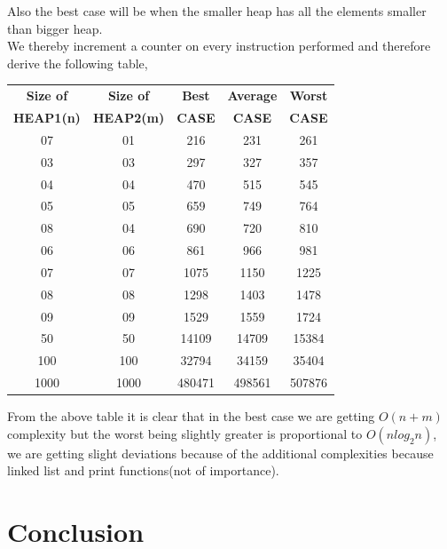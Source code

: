 \documentclass[conference]{IEEEtran}
\begin{document}
Also the best case will be when the smaller heap has all the elements smaller than bigger heap.\\
We thereby increment a counter on every instruction performed and therefore derive the following table,
\begin{table}[h!]
\begin{center}
    \label{tab:table1}
    \begin{tabular}{|c|c|c|c|c|} %
    \hline
     \textbf{Size of} & \textbf{Size of} & \textbf{Best} & \textbf{Average} & \textbf{Worst}\\
     \textbf{HEAP1(n)} & \textbf{HEAP2(m)} & \textbf{CASE} & \textbf{CASE} & \textbf{CASE}\\
      \hline
      07 & 01 & 216 & 231 & 261\\
      \hline
      03 & 03 & 297 & 327 & 357\\
      \hline
      04 & 04 & 470 & 515 & 545\\
      \hline
      05 & 05 & 659 & 749 & 764\\
      \hline
	  08 & 04 & 690 & 720 & 810\\
      \hline
	  06 & 06 & 861 & 966 & 981\\
      \hline
	  07 & 07 & 1075 & 1150 & 1225\\
      \hline
      08 & 08 & 1298 & 1403 & 1478\\
      \hline
      09 & 09 & 1529 & 1559 & 1724\\
      \hline
      50 & 50 & 14109 & 14709 & 15384\\
      \hline
      100 & 100 & 32794 & 34159 & 35404\\
      \hline
      1000 & 1000 & 480471 & 498561 & 507876\\
      \hline
    \end{tabular}
\end{center}
\end{table}
From the above table it is clear that in the best case we are getting $O(n + m)$ complexity but the worst being slightly greater is proportional to $O(nlog_2n)$, we are getting slight deviations because of the additional complexities because linked list and print functions(not of importance).



\section{\textbf{Conclusion}}
\end{document}

